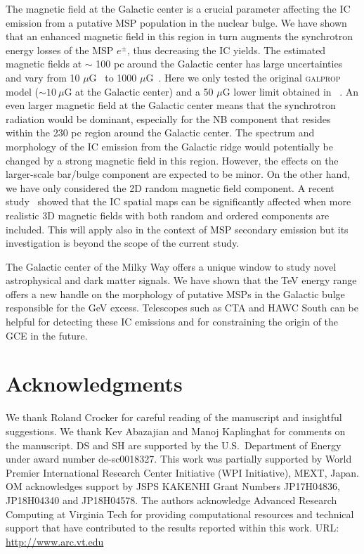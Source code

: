 \documentclass[doublespace,nopageskip]{VTthesis} %
\begin{document}
The magnetic field at the Galactic center is a crucial parameter affecting the IC emission from a putative MSP population in the nuclear bulge. We have shown that an enhanced magnetic field in this region in turn augments the synchrotron energy losses of the MSP $e^\pm$, thus decreasing the IC yields. The estimated magnetic fields at $\sim$ 100 pc around the Galactic center has large uncertainties and vary from 10 $\mu$G~\cite{2005ApJ...626L..23L} to 1000 $\mu$G~\cite{1989ApJ...343..703M}. Here we only tested the original \textsc{galprop} model ($\sim 10\ \mu$G at the Galactic center) and a 50 $\mu$G lower limit obtained in ~\citet{2010Natur.463...65C}. An even larger magnetic field at the Galactic center means that the synchrotron radiation would be dominant, especially for the NB component that resides within the 230 pc region around the Galactic center. The spectrum and morphology of the IC emission from the Galactic ridge would potentially be changed by a strong magnetic field in this region. However, the effects on the larger-scale bar/bulge component are expected to be minor. On the other hand, we have only considered the 2D random magnetic field component. A recent study~\cite{2019PhRvD..99d3007O} showed that the IC spatial maps can be significantly affected when more realistic 3D magnetic fields with both random and ordered components are included. This will apply also in the context of MSP secondary emission but its investigation is beyond the scope of the current study.

The Galactic center of the Milky Way offers a unique window to study novel astrophysical and dark matter signals. We have shown that the TeV energy range offers a new handle on the morphology of putative MSPs in the Galactic bulge responsible for the GeV excess. Telescopes such as CTA and HAWC South can be helpful for detecting these IC emissions and for constraining the origin of the GCE in the future.

\section*{Acknowledgments}
We thank Roland Crocker for careful reading of the manuscript and insightful suggestions. We thank Kev Abazajian and  Manoj Kaplinghat for comments on the manuscript. DS and SH are supported by the U.S.~Department of Energy under award number de-sc0018327. This work was partially supported by World Premier International Research Center Initiative (WPI Initiative), MEXT, Japan. OM acknowledges support by JSPS KAKENHI Grant Numbers JP17H04836, JP18H04340 and JP18H04578. The authors acknowledge Advanced Research Computing at Virginia Tech for providing computational resources and technical support that have contributed to the results reported within this work. URL: \url{http://www.arc.vt.edu}
\end{document}
